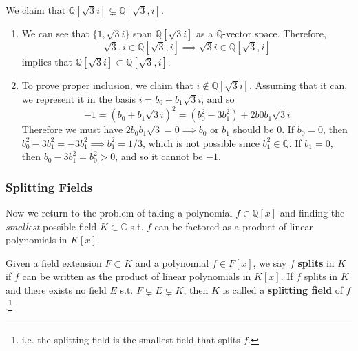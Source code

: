     \begin{example}
      We claim that $\mathbb{Q}[\sqrt{3} i] \subsetneq \mathbb{Q}[\sqrt{3}, i]$. 
      \begin{enumerate}
        \item We can see that $\{1, \sqrt{3}i \}$ span $\mathbb{Q}[\sqrt{3}i ]$ as a $\mathbb{Q}$-vector space. Therefore, 
        \begin{equation}
          \sqrt{3}, i \in \mathbb{Q}[\sqrt{3}, i] \implies \sqrt{3} i \in \mathbb{Q}[\sqrt{3}, i]
        \end{equation} 
        implies that $\mathbb{Q}[\sqrt{3} i] \subset \mathbb{Q}[\sqrt{3}, i]$. 

        \item To prove proper inclusion, we claim that $i \not\in \mathbb{Q}[\sqrt{3}i]$. Assuming that it can, we represent it in the basis $i = b_0 + b_1 \sqrt{3} i$, and so
        \begin{equation}
          -1 = (b_0 + b_1 \sqrt{3} i)^2 = (b_0^2 - 3b_1^2) + 2b0 b_1 \sqrt{3} i
        \end{equation}
        Therefore we must have $2b_0 b_1 \sqrt{3} = 0 \implies b_0$ or $b_1$ should be $0$. If $b_0 = 0$, then $b_0^2 - 3b_1^2 = -3 b_1^2 \implies b_1^2 = 1/3$, which is not possible since $b_1^2 \in \mathbb{Q}$. If $b_1 = 0$, then $b_0 - 3 b_1^2 = b_0^2 > 0$, and so it cannot be $-1$. 
      \end{enumerate}
    \end{example}

  \subsubsection{Splitting Fields}

  Now we return to the problem of taking a polynomial $f \in \mathbb{Q}[x]$ and finding the \textit{smallest} possible field $K \subset \mathbb{C}$ s.t. $f$ can be factored as a product of linear polynomials in $K[x]$. 

  \begin{definition}
    Given a field extension $F \subset K$ and a polynomial $f \in F[x]$, we say $f$ \textbf{splits} in $K$ if $f$ can be written as the product of linear polynomials in $K[x]$. If $f$ splits in $K$ and there exists no field $E$ s.t. $F \subsetneq E \subsetneq K$, then $K$ is called a \textbf{splitting field} of $f$.\footnote{i.e. the splitting field is the smallest field that splits $f$.} 
  \end{definition}

